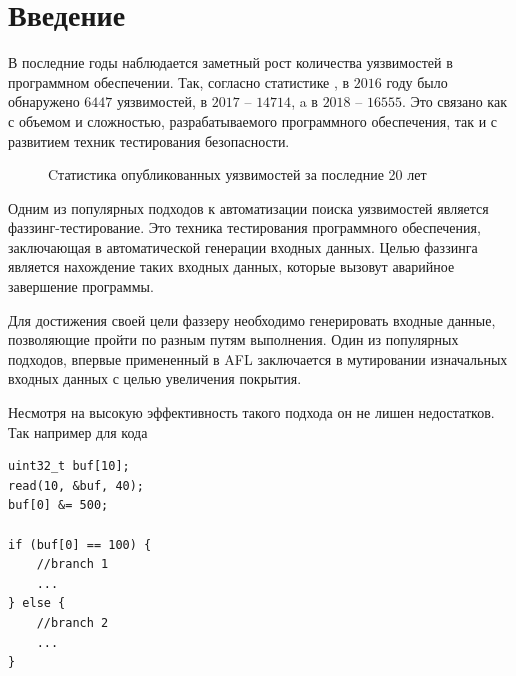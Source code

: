 \chapter*{Введение}


В последние годы наблюдается заметный рост количества уязвимостей в программном обеспечении. Так, согласно статистике \cite{CVEstats}, в $2016$ году было обнаружено $6447$ уязвимостей, в $2017$ --  $14714$, a в $2018$ -- $16555$. Это связано как с объемом и сложностью, разрабатываемого программного обеспечения, так и с развитием техник тестирования безопасности.

\begin{figure}[h]
    \caption{Cтатистика опубликованных уязвимостей за последние 20 лет}
    \label{fig:image}
\end{figure}

Одним из популярных подходов к автоматизации поиска уязвимостей является фаззинг-тестирование. Это
техника тестирования программного обеспечения, заключающая в автоматической генерации входных данных. Целью фаззинга является нахождение таких входных данных, которые вызовут аварийное завершение программы.

Для достижения своей цели фаззеру необходимо генерировать входные данные, позволяющие пройти по разным путям выполнения. Один из популярных подходов, впервые примененный в AFL \cite{AFL} заключается в мутировании изначальных входных данных с целью увеличения покрытия.

Несмотря на высокую эффективность такого подхода он не лишен недостатков. Так например для кода
\begin{lstlisting}[environoment=C_LANG, label=example1]
uint32_t buf[10];
read(10, &buf, 40);
buf[0] &= 500;

if (buf[0] == 100) {
    //branch 1
    ...
} else {
    //branch 2
    ...
}
\end{lstlisting}

